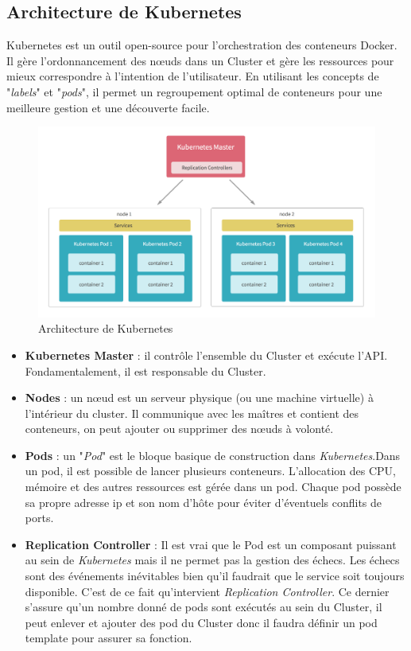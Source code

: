 \begin{onehalfspace}
\subsection{Architecture de Kubernetes}
Kubernetes est un outil open-source pour l'orchestration des conteneurs Docker. Il gère l'ordonnancement des nœuds dans un Cluster et gère les ressources pour mieux correspondre à l'intention de l'utilisateur. En utilisant les concepts de "\emph{labels}" et "\emph{pods}", il permet un regroupement optimal de conteneurs pour une meilleure gestion et une découverte facile.
\begin{figure}[H]
\centering
\includegraphics [scale=0.4]{chapitre3/assets/archkuber.png}
\caption{Architecture de Kubernetes}
\end{figure}

\begin{itemize}
\item \textbf{Kubernetes Master} : il contrôle l'ensemble du Cluster et exécute l'API. Fondamentalement, il est responsable du Cluster.

\item \textbf{Nodes} : un nœud est un serveur physique (ou une machine virtuelle) à l'intérieur du cluster. Il communique avec les maîtres et contient des conteneurs, on peut ajouter ou supprimer des nœuds à volonté.

\item \textbf{Pods} : un "\emph{Pod}" est le bloque basique de construction dans \emph{Kubernetes}.Dans un pod, il est possible de lancer plusieurs conteneurs. L'allocation des CPU, mémoire et des autres ressources est gérée dans un pod. Chaque pod possède sa propre adresse ip et son nom d'hôte pour éviter d'éventuels conflits de ports.

\item \textbf{Replication Controller} : Il est vrai que le Pod est un composant puissant au sein de \emph{Kubernetes} mais il ne permet pas la gestion des échecs. Les échecs sont des événements inévitables bien qu'il faudrait que le service soit toujours disponible. C'est de ce fait qu'intervient \emph{Replication Controller}. Ce dernier s'assure qu'un nombre donné de pods sont exécutés au sein du Cluster, il peut enlever et ajouter des pod du Cluster donc il faudra définir un pod template pour assurer sa fonction.


\end{itemize}
\end{onehalfspace}
